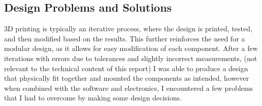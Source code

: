 \subsection{Design Problems and Solutions}
3D printing is typically an iterative process, where the design is printed, tested, and then modified based on the results.
This further reinforces the need for a modular design, as it allows for easy modification of each component.
After a few iterations with errors due to tolerances and slightly incorrect measurements, (not relevant to the technical content of this report)
I was able to produce a design that physically fit together and mounted the components as intended, however when combined with the software
and electronics, I encountered a few problems that I had to overcome by making some design decisions.
